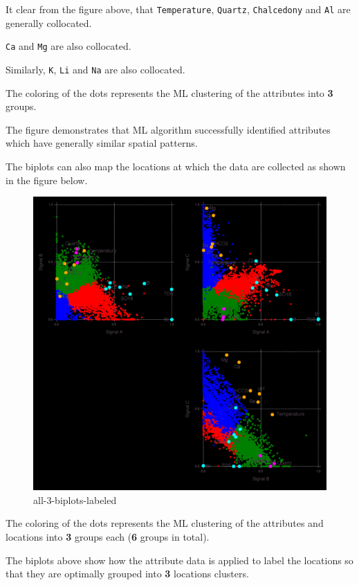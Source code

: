 \documentclass[11pt]{article}
\begin{document}
It clear from the figure above, that \texttt{Temperature},
\texttt{Quartz}, \texttt{Chalcedony} and \texttt{Al} are generally
collocated.

\texttt{Ca} and \texttt{Mg} are also collocated.

Similarly, \texttt{K}, \texttt{Li} and \texttt{Na} are also collocated.

The coloring of the dots represents the ML clustering of the attributes
into \textbf{3} groups.

The figure demonstrates that ML algorithm successfully identified
attributes which have generally similar spatial patterns.

The biplots can also map the locations at which the data are collected
as shown in the figure below.

\begin{figure}
\centering
\includegraphics{../figures-postprocessing-nl-640/all-3-biplots-labeled.png}
\caption{all-3-biplots-labeled}
\end{figure}

The coloring of the dots represents the ML clustering of the attributes
and locations into \textbf{3} groups each (\textbf{6} groups in total).

The biplots above show how the attribute data is applied to label the
locations so that they are optimally grouped into \textbf{3} locations
clusters.


    
    
    
\end{document}
